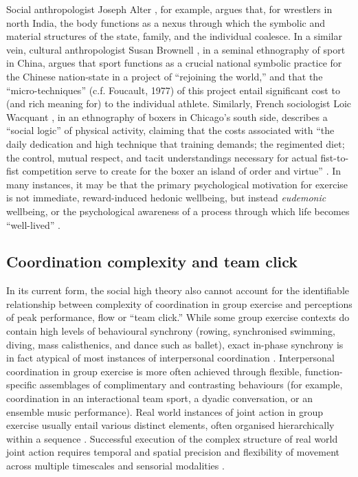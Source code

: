 \begin{CJK}{UTF8}{gbsn}
Social anthropologist Joseph Alter \textcite{Alter1993}, for example, argues that, for wrestlers in north India, the body functions as a nexus through which the symbolic and material structures of the state, family, and the individual coalesce.  In a similar vein, cultural anthropologist Susan Brownell \textcite{Brownell1995}, in a seminal ethnography of sport in China, argues that sport functions as a crucial national symbolic practice for the Chinese nation-state in a project of ``rejoining the world,'' and that the ``micro-techniques'' (c.f. Foucault, 1977) of this project entail significant cost to (and rich meaning for) to the individual athlete.   Similarly, French sociologist Loic Wacquant \textcite{Wacquant2004}, in an ethnography of boxers in Chicago's south side, describes a ``social logic'' of physical activity, claiming that the costs associated with ``the daily dedication and high technique that training demands; the regimented diet; the control, mutual respect, and tacit understandings necessary for actual fist-to-fist competition serve to create for the boxer an island of order and virtue'' \textcite[17]{Wacquant2004}. In many instances, it may be that the primary psychological motivation for exercise is not immediate, reward-induced hedonic wellbeing, but instead \textit{eudemonic} wellbeing, or the psychological awareness of a process through which life becomes ``well-lived'' \citep{Fave2009,Huta2013}.

\subsection{Coordination complexity and team click\label{sect:linksComplexClick}}
In its current form, the social high theory also cannot account for the identifiable relationship between complexity of coordination in group exercise and perceptions of peak performance, flow or ``team click.''  While some group exercise contexts do contain high levels of behavioural synchrony (rowing, synchronised swimming, diving, mass calisthenics, and dance such as ballet), exact in-phase synchrony is in fact atypical of most instances of interpersonal coordination \citep{Fusaroli2014}.  Interpersonal coordination in group exercise is more often achieved through flexible, function-specific assemblages of complimentary and contrasting behaviours (for example, coordination in an interactional team sport, a dyadic conversation, or an ensemble music performance).  Real world instances of joint action in group exercise usually entail various distinct elements, often organised hierarchically within a sequence \citep{Schmidt1975,Rosenbaum2009}.  Successful execution of the complex structure of real world joint action requires temporal and spatial precision and flexibility of movement across multiple timescales and sensorial modalities \citep{Sebanz2006}.


\end{CJK}
